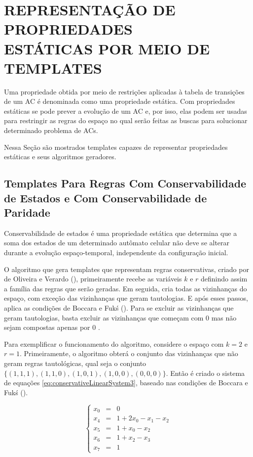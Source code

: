 \section[REPRESENTAÇÃO DE PROPRIEDADES ESTÁTICAS POR MEIO DE TEMPLATES]{REPRESENTAÇÃO DE PROPRIEDADES \\ ESTÁTICAS POR MEIO DE TEMPLATES}
\label{sec:propriedadesEstaticas}
Uma propriedade obtida por meio de restrições aplicadas à tabela de transições de um AC é denominada como uma propriedade estática. Com propriedades estáticas se pode prever a evolução de um AC e, por isso, elas podem ser usadas para restringir as regras do espaço no qual serão feitas as buscas para solucionar determinado problema de ACs.

Nessa Seção são mostrados templates capazes de representar propriedades estáticas e seus algoritmos geradores.

\subsection{Templates Para Regras Com Conservabilidade de Estados e Com Conservabilidade de Paridade}
Conservabilidade de estados é uma propriedade estática que determina que a soma dos estados de um determinado autômato celular não deve se alterar durante a evolução espaço-temporal, independente da configuração inicial.

O algoritmo que gera templates que representam regras conservativas, criado por de Oliveira e Verardo (\citeyear{deOliveira2014}), primeiramente recebe as variáveis $k$ e $r$ definindo assim a família das regras que serão geradas. Em seguida, cria todas as vizinhanças do espaço, com exceção das vizinhanças que geram tautologias. E após esses passos, aplica as condições de Boccara e Fukś (\citeyear{boccara2002}). Para se excluir as vizinhanças que geram tautologias, basta excluir as vizinhanças que começam com 0 mas não sejam compostas apenas por 0 \cite{Schranko2010}.

Para exemplificar o funcionamento do algoritmo, considere o espaço com $k=2$ e $r=1$. Primeiramente, o algoritmo obterá o conjunto das vizinhanças que não geram regras tautológicas, qual seja o conjunto $\{(1,1,1),(1,1,0),(1,0,1),(1,0,0),(0,0,0)\}$. Então é criado o sistema de equações \eqref{eq:conservativeLinearSystem3}, baseado nas condições de Boccara e Fukś (\citeyear{boccara2002}).

\begin{equation}
\left\{\begin{matrix}
 x_0 & = & 0\\ 
 x_4 & = & 1 +2x_0 -x_1 -x_2\\ 
 x_5 & = & 1 +x_0 -x_2\\
 x_6 & = & 1 +x_2 -x_3\\ 
 x_7 & = & 1
\end{matrix}\right.
\label{eq:conservativeLinearSystem3}
\end{equation}

